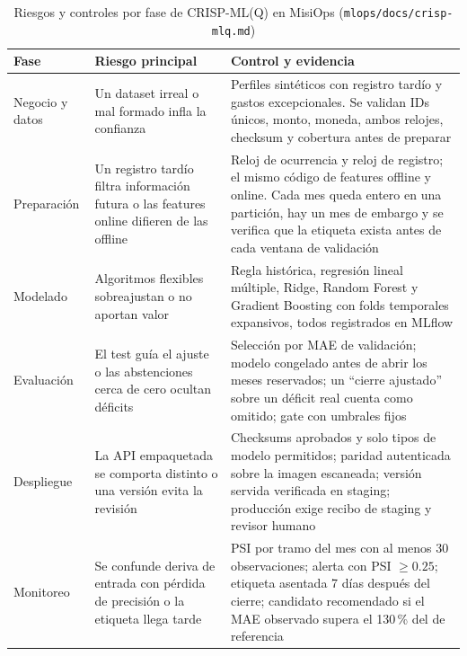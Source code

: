 \begin{table}[H]
    \centering
    \small
    \caption{Riesgos y controles por fase de CRISP-ML(Q) en MisiOps (\texttt{mlops/docs/crisp-mlq.md})}
    \label{tab:mlops-crisp}
    \begin{tabularx}{\textwidth}{@{}L{2.3cm} L{4.2cm} Y@{}}
        \toprule
        \textbf{Fase} & \textbf{Riesgo principal} & \textbf{Control y evidencia} \\
        \midrule
        Negocio y datos & Un dataset irreal o mal formado infla la confianza & Perfiles sintéticos con registro tardío y gastos excepcionales. Se validan IDs únicos, monto, moneda, ambos relojes, checksum y cobertura antes de preparar \\
        Preparación & Un registro tardío filtra información futura o las features online difieren de las offline & Reloj de ocurrencia y reloj de registro; el mismo código de features offline y online. Cada mes queda entero en una partición, hay un mes de embargo y se verifica que la etiqueta exista antes de cada ventana de validación \\
        Modelado & Algoritmos flexibles sobreajustan o no aportan valor & Regla histórica, regresión lineal múltiple, Ridge, Random Forest y Gradient Boosting con folds temporales expansivos, todos registrados en MLflow \\
        Evaluación & El test guía el ajuste o las abstenciones cerca de cero ocultan déficits & Selección por MAE de validación; modelo congelado antes de abrir los meses reservados; un ``cierre ajustado'' sobre un déficit real cuenta como omitido; gate con umbrales fijos \\
        Despliegue & La API empaquetada se comporta distinto o una versión evita la revisión & Checksums aprobados y solo tipos de modelo permitidos; paridad autenticada sobre la imagen escaneada; versión servida verificada en staging; producción exige recibo de staging y revisor humano \\
        Monitoreo & Se confunde deriva de entrada con pérdida de precisión o la etiqueta llega tarde & PSI por tramo del mes con al menos 30 observaciones; alerta con PSI $\geq 0.25$; etiqueta asentada 7 días después del cierre; candidato recomendado si el MAE observado supera el 130\,\% del de referencia \\
        \bottomrule
    \end{tabularx}
\end{table}

